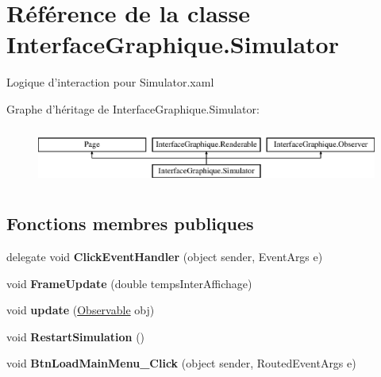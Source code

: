 \hypertarget{class_interface_graphique_1_1_simulator}{\section{Référence de la classe Interface\-Graphique.\-Simulator}
\label{class_interface_graphique_1_1_simulator}
}


Logique d'interaction pour Simulator.\-xaml  


Graphe d'héritage de Interface\-Graphique.\-Simulator\-:\begin{figure}[H]
\begin{center}
\leavevmode
\includegraphics[height=1.895093cm]{class_interface_graphique_1_1_simulator}
\end{center}
\end{figure}
\subsection*{Fonctions membres publiques}
\begin{DoxyCompactItemize}
\item 
\hypertarget{class_interface_graphique_1_1_simulator_ae8b1f200692134144bc420c95eea9b03}{delegate void {\bfseries Click\-Event\-Handler} (object sender, Event\-Args e)}\label{class_interface_graphique_1_1_simulator_ae8b1f200692134144bc420c95eea9b03}

\item 
\hypertarget{class_interface_graphique_1_1_simulator_a00a633b482ada4aa037e72d9b860f0a1}{void {\bfseries Frame\-Update} (double temps\-Inter\-Affichage)}\label{class_interface_graphique_1_1_simulator_a00a633b482ada4aa037e72d9b860f0a1}

\item 
\hypertarget{class_interface_graphique_1_1_simulator_ac4645b6fb396c5f0c06b286e56ec0198}{void {\bfseries update} (\hyperlink{interface_interface_graphique_1_1_observable}{Observable} obj)}\label{class_interface_graphique_1_1_simulator_ac4645b6fb396c5f0c06b286e56ec0198}

\item 
\hypertarget{class_interface_graphique_1_1_simulator_a098c4852546c41fa59c43204e2bcc0ec}{void {\bfseries Restart\-Simulation} ()}\label{class_interface_graphique_1_1_simulator_a098c4852546c41fa59c43204e2bcc0ec}

\item 
\hypertarget{class_interface_graphique_1_1_simulator_abf8ab18c15c018fd7ca10241eb260325}{void {\bfseries Btn\-Load\-Main\-Menu\-\_\-\-Click} (object sender, Routed\-Event\-Args e)}\label{class_interface_graphique_1_1_simulator_abf8ab18c15c018fd7ca10241eb260325}

\end{DoxyCompactItemize}
